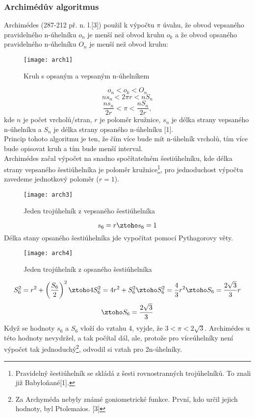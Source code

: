 \documentclass[rocnikovka]{gzwroc} %
\begin{document}
\subsubsection{Archimédův algoritmus}
Archimédes (287-212 př. n. l.[3]) použil k výpočtu $\pi$ úvahu, že obvod vepsaného pravidelného n-úhelníku $o_n$ je menší než obvod kruhu $o_k$ a že obvod opsaného pravidelného n-úhelníku $O_n$ je menší než obvod kruhu:
\begin{figure}[!ht]
\texttt{[image: arch1]}
\caption{Kruh s opsaným a vepsaným n-úhelníkem}
\label{fig:kruh}
\end{figure}
$$ o_n<o_k<O_n $$
$$ ns_n<2\pi r<nS_n $$
\begin{equation}
\frac{ns_n}{2r}<\pi<\frac{nS_n}{2r},
\end{equation}
kde $n$ je počet vrcholů/stran, $r$ je poloměr kružnice, $s_n$ je délka strany vepsaného n-úhelníku a $S_n$ je délka strany opsaného n-úhelníku [1].\\
Princip tohoto algoritmu je ten, že čím více bude mít n-úhelník vrcholů, tím více bude opisovat kruh a tím bude menší interval.\\
Archimédes začal výpočet na snadno spočítatelném šestiúhelníku, kde délka strany vepsaného šestiúhelníka je poloměr kružnice\footnote[5]{Pravidelný šestiúhelník se skládá z šesti rovnostranných trojúhelníků. To znali již Babyloňané[1].}, pro jednoduchost výpočtu zavedeme jednotkový poloměr ($r=1$).
\begin{figure}[!ht]
\texttt{[image: arch3]}
\caption{Jeden trojúhelník z vepsaného šestiúhelníka}
\label{fig:kruh}
\end{figure}
\begin{equation}
s_6=r \ztoho s_6=1
\end{equation}
Délka stany opsaného šestiúhelníka jde vypočítat pomocí Pythagorovy věty.
\begin{figure}[!ht]
\texttt{[image: arch4]}
\caption{Jeden trojúhelník z opsaného šestiúhelníka}
\label{fig:kruh}
\end{figure}
$$ S_6^2=r^2+\left(\frac{S_6}{2}\right)^2 \ztoho 4S_6^2=4r^2+S_6^2 \ztoho S_6^2=\frac{4}{3}r^2 \ztoho S_6=\frac{2\sqrt{3}}{3}r $$
\begin{equation}
\ztoho S_6=\frac{2\sqrt{3}}{3}
\end{equation}
Když se hodnoty $s_6$ a $S_6$ vloží do vztahu 4, vyjde, že $3<\pi <2\sqrt{3}$. Archimédes u této hodnoty nevydržel, a tak počítal dál, ale, protože pro víceúhelníky není výpočet tak jednoduchý\footnote[6]{Za Archyméda nebyly známé goniometrické funkce. První, kdo určil jejich hodnoty, byl Ptolemaios. [3]}, odvodil si vztah pro 2n-úhelníky.\\
\end{document}
